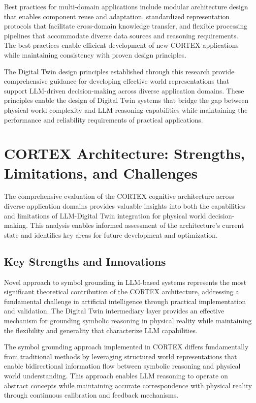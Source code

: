 Best practices for multi-domain applications include modular architecture design that enables component reuse and adaptation, standardized representation protocols that facilitate cross-domain knowledge transfer, and flexible processing pipelines that accommodate diverse data sources and reasoning requirements. The best practices enable efficient development of new CORTEX applications while maintaining consistency with proven design principles.

The Digital Twin design principles established through this research provide comprehensive guidance for developing effective world representations that support LLM-driven decision-making across diverse application domains. These principles enable the design of Digital Twin systems that bridge the gap between physical world complexity and LLM reasoning capabilities while maintaining the performance and reliability requirements of practical applications.

\section{CORTEX Architecture: Strengths, Limitations, and Challenges}

The comprehensive evaluation of the CORTEX cognitive architecture across diverse application domains provides valuable insights into both the capabilities and limitations of LLM-Digital Twin integration for physical world decision-making. This analysis enables informed assessment of the architecture's current state and identifies key areas for future development and optimization.

\subsection{Key Strengths and Innovations}

Novel approach to symbol grounding in LLM-based systems represents the most significant theoretical contribution of the CORTEX architecture, addressing a fundamental challenge in artificial intelligence through practical implementation and validation. The Digital Twin intermediary layer provides an effective mechanism for grounding symbolic reasoning in physical reality while maintaining the flexibility and generality that characterize LLM capabilities.

The symbol grounding approach implemented in CORTEX differs fundamentally from traditional methods by leveraging structured world representations that enable bidirectional information flow between symbolic reasoning and physical world understanding. This approach enables LLM reasoning to operate on abstract concepts while maintaining accurate correspondence with physical reality through continuous calibration and feedback mechanisms.

